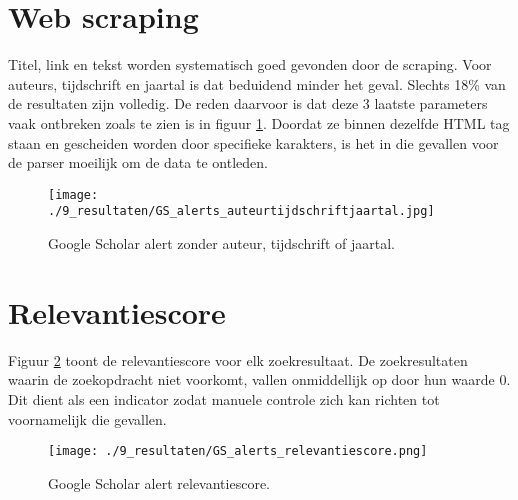 \section{Web scraping}
Titel, link en tekst worden systematisch goed gevonden door de scraping. Voor auteurs, tijdschrift en jaartal is dat beduidend minder het geval. Slechts 18\% van de resultaten zijn volledig. De reden daarvoor is dat deze 3 laatste parameters vaak ontbreken zoals te zien is in figuur \ref{fig:GSauteurtijdschriftjaartal}. Doordat ze binnen dezelfde HTML tag staan en gescheiden worden door specifieke karakters, is het in die gevallen voor de parser moeilijk om de data te ontleden.
\begin{figure}[h!]
    \centering
    \texttt{[image: ./9\_resultaten/GS\_alerts\_auteurtijdschriftjaartal.jpg]}
    \caption[Google Scholar alert zonder auteur, tijdschrift of jaartal.]{\label{fig:GSauteurtijdschriftjaartal}Google Scholar alert zonder auteur, tijdschrift of jaartal.}
\end{figure}

\section{Relevantiescore}
Figuur \ref{fig:GSrelevantie} toont de relevantiescore voor elk zoekresultaat. De zoekresultaten waarin de zoekopdracht niet voorkomt, vallen onmiddellijk op door hun waarde 0. Dit dient als een indicator zodat manuele controle zich kan richten tot voornamelijk die gevallen.
\begin{figure}[h!]
    \centering
    \texttt{[image: ./9\_resultaten/GS\_alerts\_relevantiescore.png]}
    \caption[Google Scholar alert relevantiescore.]{\label{fig:GSrelevantie}Google Scholar alert relevantiescore.}
\end{figure}

